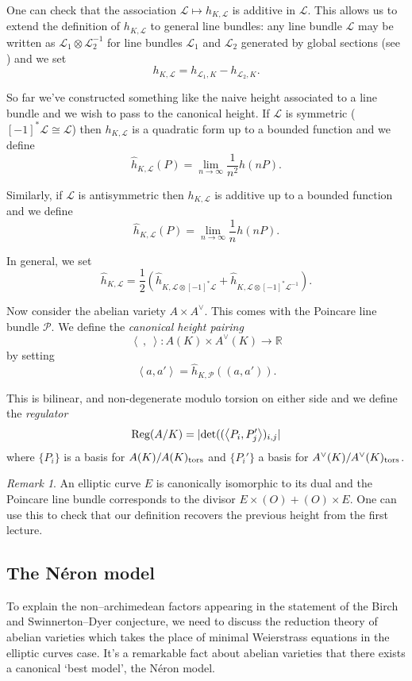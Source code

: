 \documentclass[12pt]{amsart}
\numberwithin{equation}{section}
\theoremstyle{remark}
\newtheorem{remark}[equation]{Remark}
\theoremstyle{definition}
\theoremstyle{definition}
\theoremstyle{definition}
\theoremstyle{definition}
\theoremstyle{definition}
\theoremstyle{definition}
\theoremstyle{definition}
\begin{document}
One can check that the association $\mathcal{L}\mapsto h_{K,\mathcal{L}}$ is additive in $\mathcal{L}$. This allows us to extend the definition of $h_{K,\mathcal{L}}$ to general line bundles: any line bundle $\mathcal{L}$ may be written as
$\mathcal{L}_1\otimes \mathcal{L}_2^{-1}$ for  line bundles $\mathcal{L}_1$ and $\mathcal{L}_2$  generated by global sections (see \cite[Theorem 2.5.17]{MR0463157}) and we set
\[h_{K,\mathcal{L}}=h_{\mathcal{L}_1,K}-h_{\mathcal{L}_2,K}.\]

So far we've constructed something like the naive height associated to a line bundle and we wish to pass to the canonical height. 
If $\mathcal{L}$ is symmetric ($[-1]^*\mathcal{L} \cong \mathcal{L}$) then $h_{K,\mathcal{L}}$ is a quadratic form up to a bounded function and we define
\[\hat{h}_{K,\mathcal{L}}(P)=\lim_{n\rightarrow \infty} \frac{1}{n^2}h(nP).\]

Similarly, if $\mathcal{L}$ is antisymmetric then $h_{K,\mathcal{L}}$ is additive up to a bounded function and we define
\[\hat{h}_{K,\mathcal{L}}(P)=\lim_{n\rightarrow \infty} \frac{1}{n}h(nP).\]

In general, we set
\[\hat{h}_{K,\mathcal{L}}=\frac{1}{2}\left(\hat{h}_{K,\mathcal{L}\otimes [-1]^*\mathcal{L}}+\hat{h}_{K,\mathcal{L}\otimes [-1]^*\mathcal{L}^{-1}}\right).\]

Now consider the abelian variety $A\times A^{\vee}$. This comes with the Poincare line bundle $\mathcal{P}$. We define the \textit{canonical height pairing}
\[\left \langle ~,~ \right \rangle:A(K)\times A^{\vee}(K)\rightarrow \mathbb{R}\]
by setting
\[\left \langle a,a'\right  \rangle =\hat{h}_{K,\mathcal{P}}\left((a,a')\right).\]

This is bilinear, and non-degenerate modulo torsion on either side and we define the \textit{regulator}
\[\textup{Reg}(A/K)=|\textup{det}((\left \langle P_i,P'_j \right \rangle )_{i,j} |\]
where $\{P_i\}$ is a basis for $A(K)/A(K)_{\textup{tors}}$ and $\{P_i'\}$ a basis for  $A^\vee(K)/A^\vee(K)_{\textup{tors}}$.

\begin{remark}
An elliptic curve $E$ is canonically isomorphic to its dual and the Poincare line bundle corresponds to the divisor $E\times (O)+(O)\times E$. One can use this to check that our definition recovers the previous height from the first lecture.
\end{remark}

\subsection{The N\'{e}ron model} To explain the non--archimedean factors appearing in the statement of the Birch and Swinnerton--Dyer conjecture, we need to discuss the reduction theory of abelian varieties which takes the place of minimal Weierstrass equations in the elliptic curves case. It's a remarkable fact about abelian varieties that there exists a canonical `best model', the N\'{e}ron model.
\end{document}
